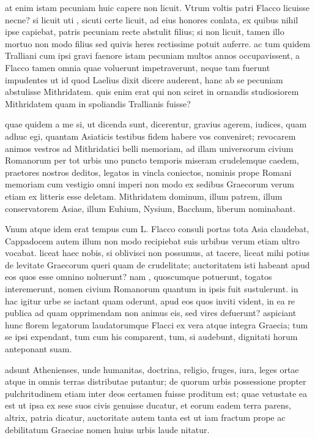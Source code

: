  at enim istam pecuniam huic capere non licuit. Vtrum voltis patri Flacco licuisse necne? si licuit uti , sicuti certe licuit, ad eius honores conlata, ex quibus nihil ipse capiebat, patris pecuniam recte abstulit filius; si non licuit, tamen illo mortuo non modo filius sed quivis heres rectissime potuit auferre. ac tum quidem Tralliani cum ipsi gravi faenore istam pecuniam multos annos occupavissent, a Flacco tamen omnia quae voluerunt impetraverunt, neque tam fuerunt impudentes ut id quod Laelius dixit dicere auderent, hanc ab se pecuniam abstulisse Mithridatem. quis enim erat qui non sciret in ornandis studiosiorem Mithridatem quam in spoliandis Trallianis fuisse?

 quae quidem a me si, ut dicenda sunt, dicerentur, gravius agerem, iudices, quam adhuc egi, quantam Asiaticis testibus fidem habere vos conveniret; revocarem animos vestros ad Mithridatici belli memoriam, ad illam universorum civium Romanorum per tot urbis uno puncto temporis miseram crudelemque caedem, praetores nostros deditos, legatos in vincla coniectos, nominis prope Romani memoriam cum vestigio omni imperi non modo ex sedibus Graecorum verum etiam ex litteris esse deletam. Mithridatem dominum, illum patrem, illum conservatorem Asiae, illum Euhium, Nysium, Bacchum, liberum nominabant.

 Vnum atque idem erat tempus cum L. Flacco consuli portas tota Asia claudebat, Cappadocem autem illum non modo recipiebat suis urbibus verum etiam ultro vocabat. liceat haec nobis, si oblivisci non possumus, at tacere, liceat mihi potius de levitate Graecorum queri quam de crudelitate; auctoritatem isti habeant apud eos quos esse omnino noluerunt? nam , quoscumque potuerunt, togatos interemerunt, nomen civium Romanorum quantum in ipsis fuit sustulerunt. in hac igitur urbe se iactant quam oderunt, apud eos quos inviti vident, in ea re publica ad quam opprimendam non animus eis, sed vires defuerunt? aspiciant hunc florem legatorum laudatorumque Flacci ex vera atque integra Graecia; tum se ipsi expendant, tum cum his comparent, tum, si audebunt, dignitati horum anteponant suam.

 adsunt Athenienses, unde humanitas, doctrina, religio, fruges, iura, leges ortae atque in omnis terras distributae putantur; de quorum urbis possessione propter pulchritudinem etiam inter deos certamen fuisse proditum est; quae vetustate ea est ut ipsa ex sese suos civis genuisse ducatur, et eorum eadem terra parens, altrix, patria dicatur, auctoritate autem tanta est ut iam fractum prope ac debilitatum Graeciae nomen huius urbis laude nitatur.

